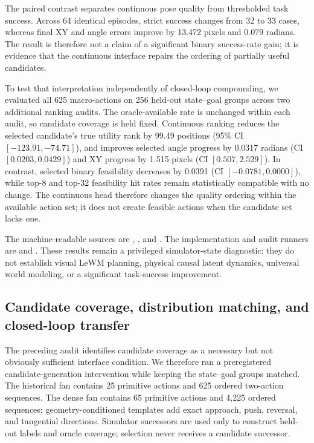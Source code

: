 \documentclass{article}
\begin{document}
The paired contrast separates continuous pose quality from thresholded task
success. Across 64 identical episodes, strict success changes from 32 to 33
cases, whereas final XY and angle errors improve by 13.472 pixels and 0.079
radians. The result is therefore not a claim of a significant binary
success-rate gain; it is evidence that the continuous interface repairs the
ordering of partially useful candidates.

To test that interpretation independently of closed-loop compounding, we
evaluated all 625 macro-actions on 256 held-out state--goal groups across two
additional ranking audits. The oracle-available rate is unchanged within
each audit, so candidate coverage is held fixed. Continuous ranking reduces
the selected candidate's true utility rank by 99.49 positions (95\% CI
$[-123.91,-74.71]$), and improves selected angle progress by 0.0317 radians
(CI $[0.0203,0.0429]$) and XY progress by 1.515 pixels (CI
$[0.507,2.529]$). In contrast, selected binary feasibility decreases by
0.0391 (CI $[-0.0781,0.0000]$), while top-$8$ and top-$32$ feasibility hit
rates remain statistically compatible with no change. The continuous head
therefore changes the quality ordering within the available action set; it
does not create feasible actions when the candidate set lacks one.

The machine-readable sources are
,
, and
.
The implementation and audit runners are
 and
.
These results remain a privileged simulator-state diagnostic: they do not
establish visual LeWM planning, physical causal latent dynamics, universal
world modeling, or a significant task-success improvement.

\subsection{Candidate coverage, distribution matching, and closed-loop transfer}
\label{sec:supp-candidate-augmented-closure}

The preceding audit identifies candidate coverage as a necessary but not
obviously sufficient interface condition. We therefore ran a preregistered
candidate-generation intervention while keeping the state--goal groups
matched. The historical fan contains 25 primitive actions and 625 ordered
two-action sequences. The dense fan contains 65 primitive actions and 4,225
ordered sequences; geometry-conditioned templates add exact approach, push,
reversal, and tangential directions. Simulator successors are used only to
construct held-out labels and oracle coverage; selection never receives a
candidate successor.
\end{document}
